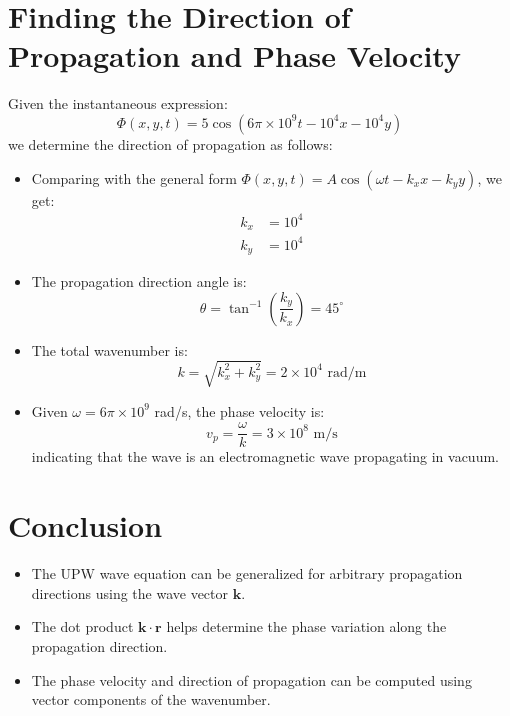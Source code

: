 \documentclass{article}
\begin{document}
\section{Finding the Direction of Propagation and Phase Velocity}
Given the instantaneous expression:
\begin{equation}
    \Phi(x,y,t) = 5 \cos(6 \pi \times 10^9 t - 10^4 x - 10^4 y)
\end{equation}
we determine the direction of propagation as follows:
\begin{itemize}
    \item Comparing with the general form $\Phi(x,y,t) = A \cos(\omega t - k_x x - k_y y)$, we get:
    \begin{align}
        k_x &= 10^4 \\
        k_y &= 10^4
    \end{align}
    \item The propagation direction angle is:
    \begin{equation}
        \theta = \tan^{-1} \left( \frac{k_y}{k_x} \right) = 45^\circ
    \end{equation}
    \item The total wavenumber is:
    \begin{equation}
        k = \sqrt{k_x^2 + k_y^2} = 2 \times 10^4 \text{ rad/m}
    \end{equation}
    \item Given $\omega = 6 \pi \times 10^9$ rad/s, the phase velocity is:
    \begin{equation}
        v_p = \frac{\omega}{k} = 3 \times 10^8 \text{ m/s}
    \end{equation}
    indicating that the wave is an electromagnetic wave propagating in vacuum.
\end{itemize}

\section{Conclusion}
\begin{itemize}
    \item The UPW wave equation can be generalized for arbitrary propagation directions using the wave vector $\mathbf{k}$.
    \item The dot product $\mathbf{k} \cdot \mathbf{r}$ helps determine the phase variation along the propagation direction.
    \item The phase velocity and direction of propagation can be computed using vector components of the wavenumber.
\end{itemize}
\end{document}
